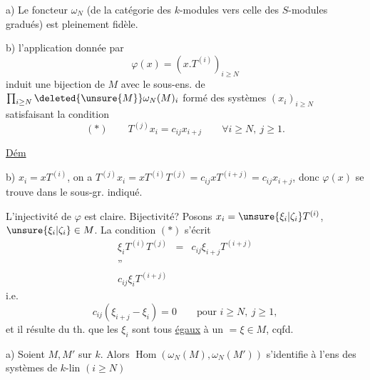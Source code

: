 
a) Le foncteur $\omega_N$ (de la catégorie des $k$-modules vers celle des $S$-modules gradués) est pleinement fidèle.

b)  l'application
donnée par
\[
\varphi(x)=(x.T^{(i)})_{i\geq N}
\]
induit une bijection de $M$ avec le sous-ens. de $\prod_{i\geq N}\deleted{\unsure{M}}\omega_N(M)_i$ formé des systèmes $(x_i)_{i\geq N}$ satisfaisant la condition
\[
(*)\qquad T^{(j)}x_i=c_{ij}x_{i+j}\qquad\forall i\geq N,\ j\geq1.
\]

\uline{Dém}

b) $x_i=xT^{(i)}$, on a $T^{(j)}x_i=xT^{(i)}T^{(j)}=c_{ij}xT^{(i+j)}=c_{ij}x_{i+j}$, donc $\varphi(x)$ se trouve dans le sous-gr. indiqué.

L'injectivité de $\varphi$ est claire. Bijectivité? Posons $x_i=\unsure{\xi_i|\zeta_i}T^{(i)}$, $\unsure{\xi_i|\zeta_i}\in M$. La condition $(*)$ s'écrit
\[
\begin{array}{ccc}
\xi_iT^{(i)}T^{(j)}&=&c_{ij}\xi_{i+j}T^{(i+j)}\\
\text{''}&&\\
c_{ij}\xi_iT^{(i+j)}&&
\end{array}
\]
i.e.
\[
c_{ij}(\xi_{i+j}-\xi_i)=0\qquad\text{pour }i\geq N,\ j\geq1,
\]
et il résulte du th. que les $\xi_i$ sont tous \uline{égaux} à un $=\xi\in M$, cqfd.

a) Soient $M,M'$ sur $k$. Alors $\operatorname{Hom}(\omega_N(M),\omega_N(M'))$ s'identifie à l'ens des systèmes de $k$-lin $(i\geq N)$
